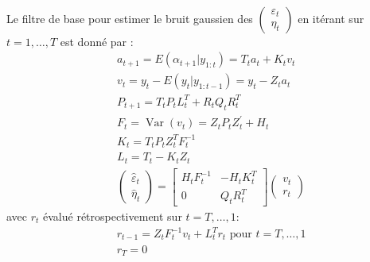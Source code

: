 \documentclass{article}
\theoremstyle{definition}
\theoremstyle{remark}
\begin{document}
\paragraph{}
Le filtre de base pour estimer le bruit gaussien des
$\left(\begin{array}{c}{
    \varepsilon_t} \\ 
{\eta}_t\end{array}
\right)$
en itérant sur $t=1, \ldots, T$
est donné par \cite{kalman}  : 
\begin{equation}
	\begin{aligned}
        &a_{t+1} =E(\alpha_{t+1} | y_{1:t}) = T_{t} a_{t}+K_{t} v_{t}\\
        &v_{t} = y_{t}-E(y_{t} |y_{1: t-1}) = y_{t}-Z_{t} a_{t}  \\
        &P_{t+1} = T_{t} P_{t} L_{t}^{T}+R_{t} Q_{t} R_{t}^{T} \\
        &F_{t} = \operatorname{Var}\left(v_{t}\right)=Z_{t} P_{t} Z_{t}^{\prime}+H_{t} \\
	&K_{t} =T_{t} P_{t} Z_{t}^{T} F_{t}^{-1} \\
	&L_{t}=T_{t}-K_{t} Z_{t} \\
	&\left(
        \begin{array}{c}{
            \hat{\varepsilon}_t} \\ 
            {\hat{\eta}_t}
        \end{array}
        \right)
        = \left[
            \begin{array}{cc}{
                H_{t} F_{t}^{-1}} & {-H_{t} K_{t}^{T}} \\
                {0} & {Q_{t} R_{t}^{T}}
            \end{array}\right]
            \left(
                \begin{array}{c}{
                    v_{t}} \\
                    {r_{t}}
                \end{array}
                \right)
            \end{aligned}
        \end{equation}
        avec $r_t$ évalué rétrospectivement sur $t=T, \ldots, 1$:
        \begin{equation}
            \label{backward}
            \begin{aligned}
                &r_{t-1} =Z_{t} F_{t}^{-1} v_{t}+L_{t}^{T} r_{t}\text{  pour  } t=T, \ldots, 1 \\
                &r_T = 0
            \end{aligned}
        \end{equation}
\end{document}
